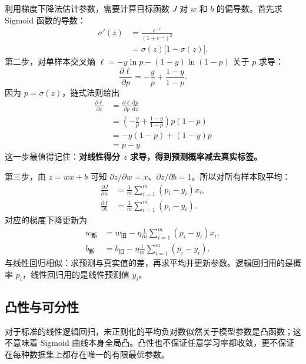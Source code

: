 利用梯度下降法估计参数，需要计算目标函数 $J$ 对 $w$ 和 $b$ 的偏导数。首先求 Sigmoid 函数的导数：
\begin{align}
\sigma'(z)
&=\frac{e^{-z}}{(1+e^{-z})^2}\\
&=\sigma(z)\big[1-\sigma(z)\big].\label{eq:sigmoid-derivative}
\end{align}
第二步，对单样本交叉熵 $\ell=-y\ln p-(1-y)\ln(1-p)$ 关于 $p$ 求导：
\[
\frac{\partial\ell}{\partial p}=-\frac yp+\frac{1-y}{1-p}.
\]
因为 $p=\sigma(z)$，链式法则给出
\begin{align*}
\frac{\partial\ell}{\partial z}
&=\frac{\partial\ell}{\partial p}\frac{\mathrm dp}{\mathrm dz}\\
&=\left(-\frac yp+\frac{1-y}{1-p}\right)p(1-p)\\
&=-y(1-p)+(1-y)p\\
&=p-y.
\end{align*}
这一步最值得记住：\textbf{对线性得分 $z$ 求导，得到预测概率减去真实标签。}

第三步，由 $z=wx+b$ 可知 $\partial z/\partial w=x$、$\partial z/\partial b=1$。所以对所有样本取平均：
\begin{equation}\label{eq:logistic-full-gradient}
\begin{aligned}
\frac{\partial J}{\partial w}&=\frac1m\sum_{i=1}^{m}(p_i-y_i)x_i,\\
\frac{\partial J}{\partial b}&=\frac1m\sum_{i=1}^{m}(p_i-y_i).
\end{aligned}
\end{equation}
对应的梯度下降更新为
\begin{equation}\label{eq:logistic-update}
\begin{aligned}
w_{\text{新}}&=w_{\text{旧}}-\eta\frac1m\sum_{i=1}^{m}(p_i-y_i)x_i,\\
b_{\text{新}}&=b_{\text{旧}}-\eta\frac1m\sum_{i=1}^{m}(p_i-y_i).
\end{aligned}
\end{equation}
与线性回归相似：求预测与真实值的差，再求平均并更新参数。逻辑回归用的是概率 $p_i$，线性回归用的是线性预测值 $\hat y_i$。

\subsection{凸性与可分性}

对于标准的线性逻辑回归，未正则化的平均负对数似然关于模型参数是凸函数；这不意味着 Sigmoid 曲线本身全局凸。凸性也不保证任意学习率都收敛，更不保证在每种数据集上都存在唯一的有限最优参数。
